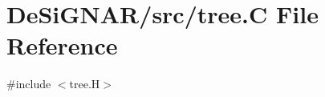 \hypertarget{tree_8_c}{}\section{De\+Si\+G\+N\+A\+R/src/tree.C File Reference}
\label{tree_8_c}
{\ttfamily \#include $<$tree.\+H$>$}\newline
